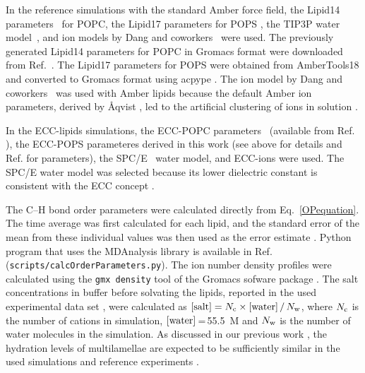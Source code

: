 \documentclass[journal=jctcce,manuscript=article]{achemso}
\begin{document}
In the reference simulations with the standard Amber force field,
the Lipid14 parameters~\cite{dickson14} for POPC, the Lipid17 parameters for POPS \cite{lipid17-future},
the TIP3P water model~\cite{jorgensen83}, and ion models by Dang and coworkers~\cite{smith94,chang1999,dang2006} were used.
The previously generated \cite{botan15} Lipid14 parameters for POPC in Gromacs format were downloaded from Ref.~. 
The Lipid17 parameters for POPS were obtained from AmberTools18 \cite{amber18} 
and converted to Gromacs format using acpype \cite{acpype}.  
The ion model by Dang and coworkers~\cite{smith94,chang1999,dang2006} was used with Amber lipids because
the default Amber ion parameters, derived by {\AA}qvist \cite{aqvist90}, led to the artificial clustering of ions in solution \cite{NMRlipidsIV}.

In the ECC-lipids simulations,
the ECC-POPC parameters~\cite{melcr18} (available from Ref. ), 
the ECC-POPS parameteres derived in this work (see above for details and Ref.  for parameters), 
the SPC/E~\cite{Berendsen1987} water model, and ECC-ions \cite{martinek17, kohagen16, Pluharova2014} were used.
The SPC/E water model was selected because its lower dielectric constant is consistent with the
ECC concept \cite{leontyev11,leontyev14}.

 
The C--H bond order parameters were calculated directly from Eq.~\ref{OPequation}.
The time average was first calculated for each lipid, and
the standard error of the mean from these individual values was then used as the
error estimate \cite{botan15,ollila16,NMRlipidsIV}.
Python program that uses the
MDAnalysis library \cite{agrawal11,gowers16} is available in Ref.~ ({\tt scripts/calcOrderParameters.py}). 
The ion number density profiles were calculated using the {\tt gmx density} tool
of the Gromacs sofware package \cite{gromacsMANUAL}.
The salt concentrations in buffer before solvating the lipids, reported in the used experimental data set \cite{roux90},
were calculated as $[{\rm salt}]=N_{\rm c} \times[{\rm water}]\,/\,N_{\rm w}$,
where $N_{\rm c}$ is the number of cations in simulation, $[{\rm water}]$\,=\,55.5~M and $N_{\rm w}$
is the number of water molecules in the simulation.
As discussed in our previous work \cite{NMRlipidsIV}, the hydration levels of
multilamellae are expected to be sufficiently similar in the used simulations and reference experiments \cite{roux90}.

\end{document}
